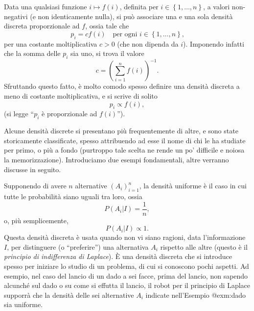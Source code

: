 \documentclass[
  italian,
  letterpaper,
]{book}
\newcommand{\bra}[1]{\left( #1 \right)}
\newcommand{\cur}[1]{\left\{ #1 \right\}}
\theoremstyle{definition}
\theoremstyle{remark}
\begin{document}
Data una qualsiasi funzione \(i \mapsto f(i)\), definita per
\(i\in\cur{1, \ldots, n}\), a valori non-negativi (e non identicamente
nulla), si può associare una e una sola densità discreta proporzionale
ad \(f\), ossia tale che
\[ p_i = c f(i) \quad \text{per ogni $i \in \cur{1, \ldots, n}$,}\] per
una costante moltiplicativa \(c>0\) (che non dipenda da \(i\)).
Imponendo infatti che la somma delle \(p_i\) sia uno, si trova il valore
\[c = \bra{ \sum_{i=1}^n f(i)}^{-1}.\] Sfruttando questo fatto, è molto
comodo spesso definire una densità discreta a meno di costante
moltiplicativa, e si scrive di solito \[ p_i \propto f(i),\] (si legge
``\(p_i\) è proporzionale ad \(f(i)\)'').

Alcune densità discrete si presentano più frequentemente di altre, e
sono state storicamente classificate, spesso attribuendo ad esse il nome
di chi le ha studiate per primo, o più a fondo (purtroppo tale scelta ne
rende un po' difficile e noiosa la memorizzazione). Introduciamo due
esempi fondamentali, altre verranno discusse in seguito.

Supponendo di avere \(n\) alternative \((A_i)_{i=1}^n\), la densità
uniforme è il caso in cui tutte le probabilità siano uguali tra loro,
ossia \[ P(A_i|I) = \frac 1 n,\] o, più semplicemente,
\[ P(A_i|I) \propto 1.\] Questa densità discreta è usata quando non vi
siano ragioni, data l'informazione \(I\), per distinguere (o
``preferire'') una alternativa \(A_i\) rispetto alle altre (questo è il
\emph{principio di indifferenza di Laplace}). È una densità discreta che
si introduce spesso per iniziare lo studio di un problema, di cui si
conoscono pochi aspetti. Ad esempio, nel caso del lancio di un dado a
sei facce, prima del lancio, non sapendo alcunché sul dado o su come si
effutta il lancio, il robot per il principio di Laplace supporrà che la
densità delle sei alternative \(A_i\) indicate nell'Esempio @exm:dado
sia uniforme.
\end{document}
